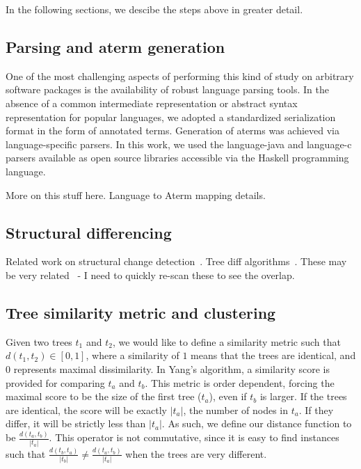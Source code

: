 \documentclass{acm_proc_article-sp}
\begin{document}
In the following sections, we descibe the steps above in greater detail.

\subsection{Parsing and aterm generation}

One of the most challenging aspects of performing this kind of
study on arbitrary software packages is the availability of
robust language parsing tools.  In the absence of a common intermediate
representation or abstract syntax representation for popular languages, 
we adopted a standardized serialization format in the form of annotated
terms.  Generation of aterms was achieved via language-specific parsers.
In this work, we used the language-java and language-c parsers available
as open source libraries accessible via the Haskell programming language.

More on this stuff here.  Language to Aterm mapping details.

\subsection{Structural differencing}

Related work on structural change detection~\cite{chawathe96change}.  Tree
diff algorithms~\cite{tai79tree, selkow77tree}.  These may be very
related~\cite{weissgerber06identify, kim07automatic, neamtiu05understand} - I
need to quickly re-scan these to see the overlap.

\subsection{Tree similarity metric and clustering}

Given two trees $t_1$ and $t_2$, we would like to define a similarity metric
such that $d(t_1, t_2) \in [0,1]$, where a similarity of $1$ means that the
trees are identical, and $0$ represents maximal dissimilarity.  In Yang's
algorithm, a similarity score is provided for comparing $t_a$ and $t_b$. This
metric is order dependent, forcing the maximal score to be the size of the
first tree ($t_a$), even if $t_b$ is larger.  If the trees are identical, the
score will be exactly $|t_a|$, the number of nodes in $t_a$.  If they differ,
it will be strictly less than $|t_a|$.  As such, we define our distance
function to be $\frac{d(t_a, t_b)}{|t_a|}$.  This operator is not commutative,
since it is easy to find instances such that $\frac{d(t_b, t_a)}{|t_b|} \neq
\frac{d(t_a, t_b)}{|t_a|}$ when the trees are very different.
\end{document}
